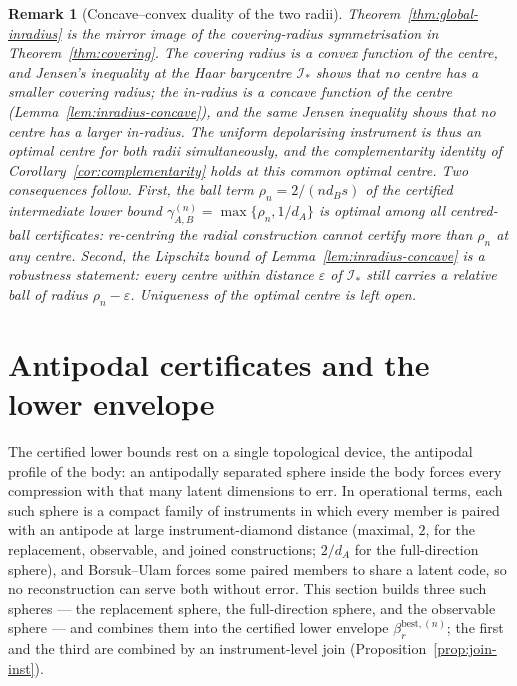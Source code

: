 \documentclass[11pt,a4paper]{article}
\newtheorem{remark}[theorem]{Remark}
\begin{document}
\begin{remark}[Concave--convex duality of the two radii]
\label{rem:duality}
Theorem~\ref{thm:global-inradius} is the mirror image of the covering-radius symmetrisation in Theorem~\ref{thm:covering}. The covering radius is a convex function of the centre, and Jensen's inequality at the Haar barycentre $\mathcal I_*$ shows that no centre has a smaller covering radius; the in-radius is a concave function of the centre (Lemma~\ref{lem:inradius-concave}), and the same Jensen inequality shows that no centre has a larger in-radius. The uniform depolarising instrument is thus an optimal centre for both radii simultaneously, and the complementarity identity of Corollary~\ref{cor:complementarity} holds at this common optimal centre. Two consequences follow. First, the ball term $\rho_n=2/(nd_Bs)$ of the certified intermediate lower bound $\gamma_{A,B}^{(n)}=\max\{\rho_n,1/d_A\}$ is optimal among all centred-ball certificates: re-centring the radial construction cannot certify more than $\rho_n$ at any centre. Second, the Lipschitz bound of Lemma~\ref{lem:inradius-concave} is a robustness statement: every centre within distance $\varepsilon$ of $\mathcal I_*$ still carries a relative ball of radius $\rho_n-\varepsilon$. Uniqueness of the optimal centre is left open.
\end{remark}

\section{Antipodal certificates and the lower envelope}
\label{sec:lower}

The certified lower bounds rest on a single topological device, the antipodal profile of the body: an antipodally separated sphere inside the body forces every compression with that many latent dimensions to err. In operational terms, each such sphere is a compact family of instruments in which every member is paired with an antipode at large instrument-diamond distance (maximal, $2$, for the replacement, observable, and joined constructions; $2/d_A$ for the full-direction sphere), and Borsuk--Ulam forces some paired members to share a latent code, so no reconstruction can serve both without error. This section builds three such spheres --- the replacement sphere, the full-direction sphere, and the observable sphere --- and combines them into the certified lower envelope $\beta_r^{\mathrm{best},(n)}$; the first and the third are combined by an instrument-level join (Proposition~\ref{prop:join-inst}).
\end{document}
